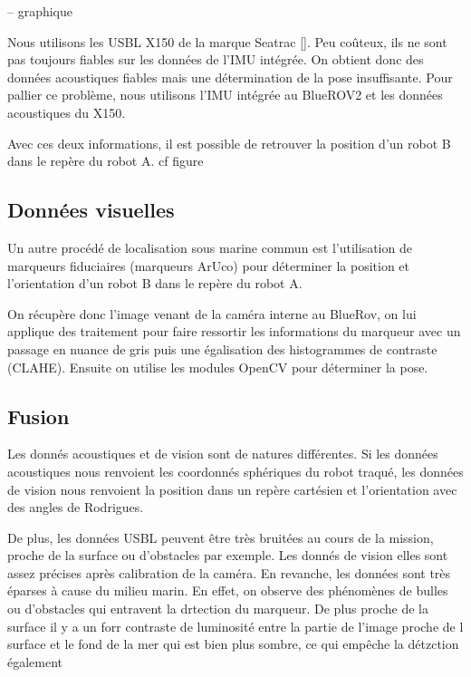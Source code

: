 \documentclass[twocolumn]{article}
\begin{document}
-- graphique


Nous utilisons les USBL X150 de la marque Seatrac []. Peu coûteux, ils ne sont pas toujours fiables sur les données de l'IMU intégrée. On obtient donc des données acoustiques fiables mais une détermination de la pose insuffisante. Pour pallier ce problème, nous utilisons l'IMU intégrée au BlueROV2 et les données acoustiques du X150. 

Avec ces deux informations, il est possible de retrouver la position d'un robot B dans le repère du robot A. cf figure

\subsection{Données visuelles}
Un autre procédé de localisation sous marine commun est l'utilisation de marqueurs fiduciaires (marqueurs ArUco) pour déterminer la position et l'orientation d'un robot B dans le repère du robot A. 

On récupère donc l'image venant de la caméra interne au BlueRov, on lui applique des  traitement pour faire ressortir les informations du marqueur avec un passage en nuance de gris puis une égalisation des histogrammes de contraste (CLAHE). Ensuite on utilise les modules OpenCV pour déterminer la pose. 

\subsection{Fusion}
Les donnés acoustiques et de vision sont de natures différentes. Si les données acoustiques nous renvoient les coordonnés sphériques du robot traqué, les données de vision nous renvoient la position dans un repère cartésien et l'orientation avec des angles de Rodrigues. 

De plus, les données USBL peuvent être très bruitées au cours de la mission, proche de la surface ou d'obstacles par exemple. Les donnés de vision elles sont assez précises après calibration de la caméra. En revanche, les données sont très éparses à cause du milieu marin. En effet, on observe des phénomènes de bulles ou d'obstacles qui entravent la drtection du marqueur. De plus proche de la surface il y a un forr contraste de luminosité entre la partie de l'image proche de l surface et le fond de la mer qui est bien plus sombre, ce qui empêche la détzction également
\end{document}
